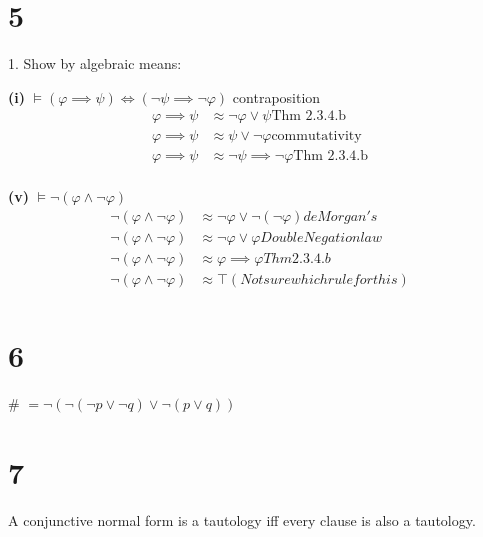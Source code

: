 \documentclass[10pt]{article}
\begin{document}

\section*{5}
\begin{description*}
	\item[1.] Show by algebraic means:
\end{description*}

\textbf{(i)} $\models (\varphi \implies \psi) \iff (\lnot \psi \implies \lnot \varphi)$ contraposition
\begin{align*}
	\varphi \implies \psi &\approx \lnot \varphi \vee \psi \text{Thm 2.3.4.b}\\
	\varphi \implies \psi &\approx \psi \vee \lnot \varphi \text{commutativity}\\
	\varphi \implies \psi &\approx \lnot \psi \implies \lnot \varphi \text{Thm 2.3.4.b}\\
\end{align*}

\textbf{(v)} $\models \lnot(\varphi \wedge \lnot \varphi)$
\begin{align*}
	\lnot(\varphi \wedge \lnot \varphi) &\approx \lnot \varphi \vee \lnot(\lnot \varphi) deMorgan's\\
	\lnot(\varphi \wedge \lnot \varphi) &\approx \lnot \varphi \vee \varphi Double Negation law\\
	\lnot(\varphi \wedge \lnot \varphi) &\approx \varphi \implies \varphi Thm 2.3.4.b \\
	\lnot(\varphi \wedge \lnot \varphi) &\approx \top (Not sure which rule for this) \\
\end{align*}


\section*{6}
{\small \#} $= \lnot (\lnot (\lnot p \lor \lnot q) \lor \lnot (p \lor q))$


\section*{7}
A conjunctive normal form is a tautology iff every clause is also a tautology.
\end{document}
